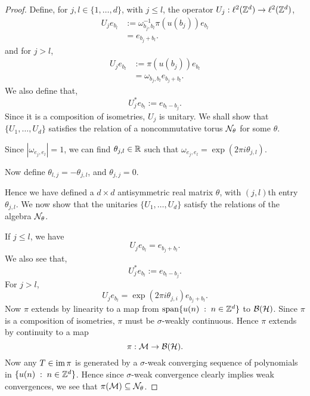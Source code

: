 \begin{proof}
    Define, for $j,l \in \{1,\ldots,d\}$, 
    with $j \leq l$, the operator $U_j:\ell^2(\mathbb{Z}^d)\to\ell^2(\mathbb{Z}^d)$,
    \begin{align}
        U_je_{b_l} &:= \omega_{b_j,b_l}^{-1}\pi(u(b_j))e_{b_l}\\
                   &= e_{b_j+b_l}.
    \end{align}
    and for $j > l$,
    \begin{align}
        U_je_{b_l} &:= \pi(u(b_j))e_{b_l}\\
                   &= \omega_{b_j,b_l}e_{b_j+b_l}.
    \end{align}
    We also define that,
    \begin{equation}
        U_j^*e_{b_l} := e_{b_l-b_j}.
    \end{equation}
    Since it is a composition of isometries, $U_j$ is unitary. We
    shall show that $\{U_1,\ldots,U_d\}$ satisfies the relation
    of a noncommutative torus $\mathcal{N}_\theta$ for some $\theta$.
    
    Since $|\omega_{e_j,e_l}| = 1$, we can find $\theta_{j,l} \in \mathbb{R}$
    such that $\omega_{e_j,e_l} = \exp(2\pi i \theta_{j,l})$. 
    
    Now define $\theta_{l,j} = -\theta_{j,l}$, and $\theta_{j,j} = 0$.
    
    Hence we have defined a $d \times d$ antisymmetric real matrix $\theta$, with $(j,l)$th
    entry $\theta_{j,l}$. We now show that the unitaries $\{U_1,\ldots,U_d\}$
    satisfy the relations of the algebra $\mathcal{N}_\theta$. 
    
    If $j \leq l$, we have
    \begin{equation}
        U_je_{b_l} = e_{b_j+b_l}.
    \end{equation}
    We also see that,
    \begin{equation}
        U_j^*e_{b_l} := e_{b_l-b_j}.
    \end{equation}
    For $j > l$,
    \begin{equation}
        U_je_{b_l} = \exp(2\pi i \theta_{j,i})e_{b_j+b_l}.
    \end{equation}
    Now $\pi$ extends by linearity to a map from $\operatorname{span}\{u(n)\;:\;n \in \mathbb{Z}^d\}$
    to $\mathcal{B}(\mathcal{H})$. Since $\pi$ is a composition of isometries, $\pi$
    must be $\sigma$-weakly continuous. Hence $\pi$ extends by continuity to a map
    \begin{equation}
        \pi:\mathcal{M}\to\mathcal{B}(\mathcal{H}).
    \end{equation}
    Now any $T \in \operatorname{im} \pi$ is generated by a $\sigma$-weak converging sequence 
    of polynomials in $\{u(n)\;:\;n \in \mathbb{Z}^d\}$. Hence since $\sigma$-weak convergence
    clearly implies weak convergences, we see that $\pi(\mathcal{M}) \subseteq \mathcal{N}_\theta$.
    

\end{proof}
